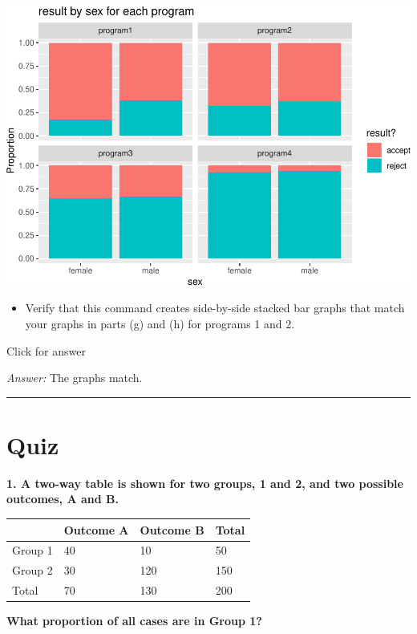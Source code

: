 \documentclass[
]{book}
\providecommand{\tightlist}{%
  \setlength{\itemsep}{0pt}\setlength{\parskip}{0pt}}
\begin{document}
\includegraphics[width=1\linewidth]{Class_Activity_4_files/figure-latex/unnamed-chunk-35-1}

\begin{itemize}
\tightlist
\item
  Verify that this command creates side-by-side stacked bar graphs that match your graphs in parts (g) and (h) for programs 1 and 2.
\end{itemize}

Click for answer

\emph{Answer:} The graphs match.

\begin{center}\rule{0.5\linewidth}{0.5pt}\end{center}

\hypertarget{quiz-3}{%
\section{Quiz}\label{quiz-3}}

\textbf{1. A two-way table is shown for two groups, 1 and 2, and two possible outcomes, A and B.}

\begin{longtable}[]{@{}llll@{}}
\toprule()
~ & Outcome A & Outcome B & Total \\
\midrule()
\endhead
Group 1 & 40 & 10 & 50 \\
Group 2 & 30 & 120 & 150 \\
Total & 70 & 130 & 200 \\
\bottomrule()
\end{longtable}

\textbf{What proportion of all cases are in Group 1?}
\end{document}
